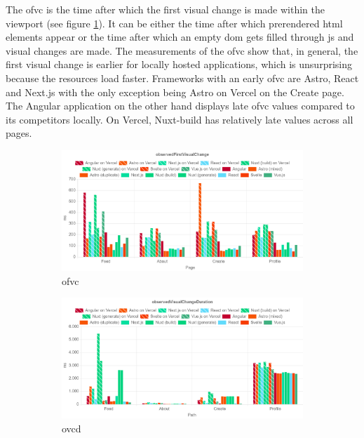 \documentclass[a4paper, 12pt]{article}
\begin{document}
The \acrshort{ofvc} is the time after which the first visual change is made within the viewport (see figure \ref{subfig:LH:observedFirstVisualChange}).
It can be either the time after which prerendered \acrshort{html} elements appear or the time after which an empty \acrshort{dom} gets filled through \acrshort{js} and visual changes are made.
The measurements of the \acrshort{ofvc} show that, in general, the first visual change is earlier for locally hosted applications, which is unsurprising because the resources load faster.
Frameworks with an early \acrshort{ofvc} are Astro, React and Next.js with the only exception being Astro on Vercel on the Create page.
The Angular application on the other hand displays late \acrshort{ofvc} values compared to its competitors locally.
On Vercel, Nuxt-build has relatively late values across all pages.


\begin{figure}[ht!]
  \centering
  \begin{subfigure}{0.95\linewidth}
    \begin{center}
      \includegraphics[width=\linewidth, keepaspectratio]{img/lighthouse-results/OFVC.png}
    \end{center}
    \caption{\acrfull{ofvc}}
    \label{subfig:LH:observedFirstVisualChange}
  \end{subfigure}
  \begin{subfigure}{0.95\linewidth}
    \begin{center}
      \includegraphics[width=\linewidth, keepaspectratio]{img/lighthouse-results/olvc-ofvc.png}
    \end{center}
    \caption{\acrfull{ovcd}}\label{subfig:LH:observedVisualChangeDuration}
    \label{fig:LH:OVCD}
  \end{subfigure}
  \caption{}
\end{figure}
\end{document}
